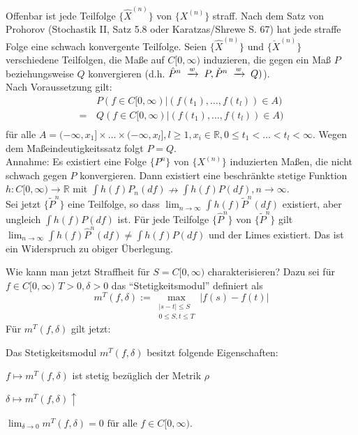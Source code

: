 \documentclass[a4paper,twoside,DIV15,BCOR12mm]{scrbook}
\begin{document}
\begin{beweis}
  Offenbar ist jede Teilfolge $\{\hat{X}^{(n)}\}$ von $\{X^{(n)}\}$ straff. Nach dem Satz von Prohorov (Stochastik II, Satz 5.8 oder Karatzas/Shrewe S. 67) hat jede straffe Folge eine schwach konvergente Teilfolge. Seien $\{\hat{X}^{(n)}\}$ und $\{\check{X}^{(n)}\}$ verschiedene Teilfolgen, die Maße auf $C[0,\infty)$ induzieren, die gegen ein Maß $P$ beziehungsweise $Q$ konvergieren (d.h. $\hat P^n\tomit{w}P,\check P^n\tomit{w}Q)$). \\
Nach Voraussetzung gilt:
\begin{align*}
 & \, P(f\in C[0,\infty) \vert (f(t_1),\dots,f(t_l))\in A) \\
=& \, Q(f\in C[0,\infty) \vert (f(t_1),\dots,f(t_l))\in A) \\
\end{align*}
für alle $A=(-\infty,x_1]\times\dots\times(-\infty,x_l],l\geq1,x_i\in\mathbb R, 0\leq t_1 <\dots< t_l<\infty$. Wegen dem Maßeindeutigkeitssatz folgt $P=Q$. \\
Annahme: Es existiert eine Folge $\{P^n\}$ von $\{X^{(n)}\}$ induzierten Maßen, die nicht schwach gegen $P$ konvergieren. Dann existiert eine beschränkte stetige Funktion $h:C[0,\infty)\longrightarrow\mathbb R$ mit $\int h(f)P_n(df)\nrightarrow \int h(f)P(df),n\to\infty$. \\
Sei jetzt $\{\tilde P^n\}$ eine Teilfolge, so dass $\lim_{n\to\infty}\int h(f)\tilde P^n(df)$ existiert, aber ungleich $\int h(f)P(df)$ ist. Für jede Teilfolge $\{\hat P^n\}$ von $\{\tilde P^n\}$ gilt $\lim_{n\to\infty}\int h(f)\hat P^n(df)\neq\int h(f)P(df)$ und der Limes existiert. Das ist ein Widerspruch zu obiger Überlegung.
\end{beweis}
Wie kann man jetzt Straffheit für $S=C[0,\infty)$ charakterisieren? Dazu sei für $f\in C[0,\infty)$ $T>0,\delta>0$ das ``Stetigkeitsmodul'' definiert als
\[
m^T(f,\delta):=\max_{\begin{array}{c} \vert s-t\vert\leq S \\ 0\leq S,t\leq T \end{array}}\vert f(s)-f(t)\vert
\]
Für $m^T(f,\delta)$ gilt jetzt:
\begin{lemma}
  \label{lemma:14.4}
Das Stetigkeitsmodul $m^T(f,\delta)$ besitzt folgende Eigenschaften:
\begin{enuma}
\item $f\mapsto m^T(f,\delta)$ ist stetig bezüglich der Metrik $\rho$
\item $\delta\mapsto m^T(f,\delta)\uparrow$
\item $\lim_{\delta\to 0} m^T(f,\delta)=0 \text{ für alle } f\in C[0,\infty)$.
\end{enuma}
\end{lemma}
\end{document}
